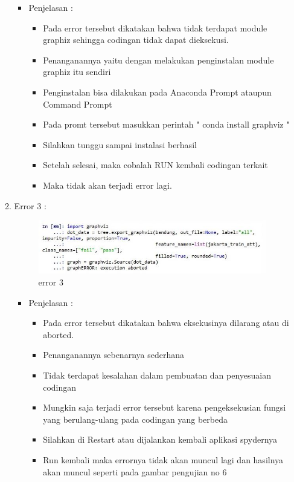 \begin{enumerate}
\begin{enumerate}
\par
\begin{itemize}
\item Penjelasan	: 
\begin{itemize}
\item Pada error tersebut dikatakan bahwa tidak terdapat module graphiz sehingga codingan tidak dapat dieksekusi.
\item Penanganannya yaitu dengan melakukan penginstalan module graphiz itu sendiri
\item Penginstalan bisa dilakukan pada Anaconda Prompt ataupun Command Prompt
\item Pada promt tersebut masukkan perintah " conda install graphviz "
\item Silahkan tunggu sampai instalasi berhasil
\item Setelah selesai, maka cobalah RUN kembali codingan terkait
\item Maka tidak akan terjadi error lagi.
\end{itemize}
\end{itemize}

\par
\item Error 3	:
\par

\begin{figure}[ht]
\centering
\includegraphics[scale=0.4]{figures/error62.jpg}
\caption{error 3}
\label{error 3}
\end{figure}

\par
\begin{itemize}
\item Penjelasan	: 
\begin{itemize}
\item Pada error tersebut dikatakan bahwa eksekusinya dilarang atau di aborted.
\item Penanganannya sebenarnya sederhana
\item Tidak terdapat kesalahan dalam pembuatan dan penyesuaian codingan 
\item Mungkin saja terjadi error tersebut karena pengeksekusian fungsi yang berulang-ulang pada codingan yang berbeda
\item Silahkan di Restart atau dijalankan kembali aplikasi spydernya
\item Run kembali maka errornya tidak akan muncul lagi dan hasilnya akan muncul seperti pada gambar pengujian no 6
\end{itemize}
\end{itemize}


\end{enumerate}
\end{enumerate}
